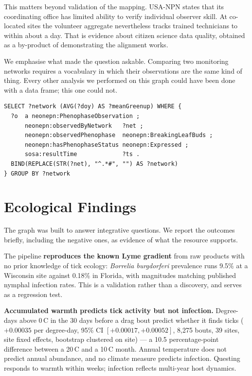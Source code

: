 This matters beyond validation of the mapping. USA-NPN states that its
coordinating office has limited ability to verify individual observer skill. At
co-located sites the volunteer aggregate nevertheless tracks trained
technicians to within about a day. That is evidence about citizen science data
quality, obtained as a by-product of demonstrating the alignment works.

We emphasise what made the question askable. Comparing two monitoring networks
requires a vocabulary in which their observations are the same kind of thing.
Every other analysis we performed on this graph could have been done with a
data frame; this one could not.

\begin{lstlisting}[caption={Both networks, one query, joined through shared PPO-aligned terms.}]
SELECT ?network (AVG(?doy) AS ?meanGreenup) WHERE {
  ?o  a neonepn:PhenophaseObservation ;
      neonepn:observedByNetwork   ?net ;
      neonepn:observedPhenophase  neonepn:BreakingLeafBuds ;
      neonepn:hasPhenophaseStatus neonepn:Expressed ;
      sosa:resultTime             ?ts .
  BIND(REPLACE(STR(?net), "^.*#", "") AS ?network)
} GROUP BY ?network
\end{lstlisting}

\section{Ecological Findings}

The graph was built to answer integrative questions. We report the outcomes
briefly, including the negative ones, as evidence of what the resource
supports.

The pipeline \textbf{reproduces the known Lyme gradient} from raw products with
no prior knowledge of tick ecology: \emph{Borrelia burgdorferi} prevalence runs
9.5\% at a Wisconsin site against 0.18\% in Florida, with magnitudes matching
published nymphal infection rates. This is a validation rather than a
discovery, and serves as a regression test.

\textbf{Accumulated warmth predicts tick activity but not infection.}
Degree-days above 0\,\textdegree C in the 30 days before a drag bout predict
whether it finds ticks ($+0.00035$ per degree-day, 95\% CI
$[+0.00017, +0.00052]$, 8{,}275 bouts, 39 sites, site fixed effects, bootstrap
clustered on site) --- a 10.5 percentage-point difference between a
20\,\textdegree C and a 10\,\textdegree C month. Annual temperature does not
predict annual abundance, and no climate measure predicts infection. Questing
responds to warmth within weeks; infection reflects multi-year host dynamics.

